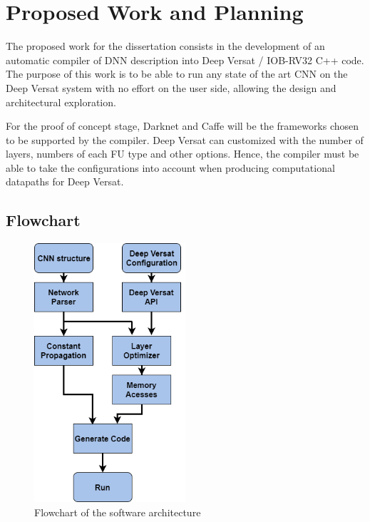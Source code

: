 \chapter{Proposed Work and Planning}
\label{chapter:PWP}

The proposed work for the dissertation consists in the development of an
automatic compiler of DNN description into Deep Versat / IOB-RV32 C++ code. The
purpose of this work is to be able to run any state of the art CNN on the Deep
Versat system with no effort on the user side, allowing the design and
architectural exploration.

For the proof of concept stage, Darknet and Caffe will be the frameworks chosen
to be supported by the compiler. Deep Versat can customized with the number of
layers, numbers of each FU type and other options. Hence, the compiler must be
able to take the configurations into account when producing computational
datapaths for Deep Versat.

\section{Flowchart}

\begin{figure}[!htbp]
    \centering
    \includegraphics[width=0.5\textwidth]{Figures/flowchart.png}
    \caption{Flowchart of the software architecture}
    \label{figure:flowchart}
\end{figure}



